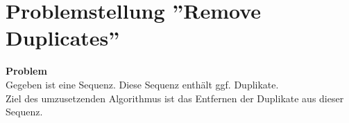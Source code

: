 \documentclass[
10pt, %
a4paper, %
oneside, %
headinclude,footinclude, %
BCOR5mm, %
]{scrartcl}
\title{\normalfont\spacedallcaps{Projektaufgabe AE}} %
\subtitle{Remove Duplicates - Spotify playlist cleaner} %
\author{\spacedlowsmallcaps{Raphael Drechsler}} %
\date{} %
\begin{document}

\renewcommand{\sectionmark}[1]{\markright{\spacedlowsmallcaps{#1}}} %
\lehead{\mbox{\llap{\small\thepage\kern1em\color{halfgray} \vline}\color{halfgray}\hspace{0.5em}\rightmark\hfil}} %

\pagestyle{scrheadings} %


\maketitle %

\setcounter{tocdepth}{2} %

\tableofcontents %







\newpage %

\section{Problemstellung ''Remove Duplicates''}

\textbf{Problem}\\
Gegeben ist eine Sequenz. Diese Sequenz enthält ggf. Duplikate. \\
Ziel des umzusetzenden Algorithmus ist das Entfernen der Duplikate aus dieser Sequenz.\\
\end{document}
